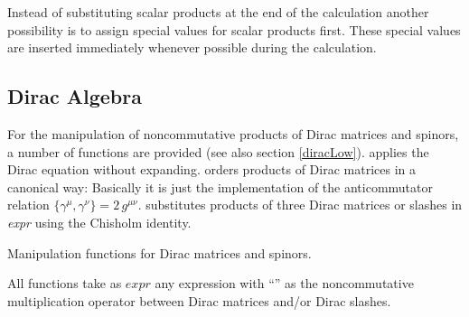 Instead of substituting scalar products at the end of the calculation 
another possibility is to assign special values for
scalar products first. These special values are inserted immediately 
whenever possible during the calculation.
\beom
{}
\enom

\subsection{Dirac Algebra}
\label{diracalg}

For the manipulation of noncommutative products of Dirac matrices and
spinors, a number of functions are provided (see also section \ref{diracLow}).
 applies the Dirac equation without expanding.
 orders products of Dirac matrices in a canonical way:
Basically it is just the implementation of the anticommutator relation $\{\gamma^{\mu}, \gamma^{\nu}\} = 2 \, g^{\mu \nu}$.
 substitutes products of three Dirac matrices or slashes in {\sl expr} using the Chisholm identity.

 {Manipulation functions for Dirac matrices and spinors.}

All functions take as $expr$
any expression with ``'' as the noncommutative multiplication operator between
Dirac matrices and/or Dirac slashes.

\beom

